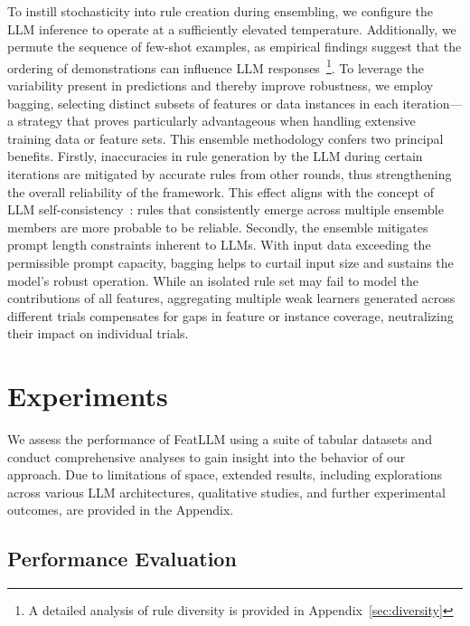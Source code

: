 To instill stochasticity into rule creation during ensembling, we configure the LLM inference to operate at a sufficiently elevated temperature. Additionally, we permute the sequence of few-shot examples, as empirical findings suggest that the ordering of demonstrations can influence LLM responses~\cite{lu2022fantastically}\footnote{A detailed analysis of rule diversity is provided in Appendix~\ref{sec:diversity}}. To leverage the variability present in predictions and thereby improve robustness, we employ bagging, selecting distinct subsets of features or data instances in each iteration—a strategy that proves particularly advantageous when handling extensive training data or feature sets. This ensemble methodology confers two principal benefits. Firstly, inaccuracies in rule generation by the LLM during certain iterations are mitigated by accurate rules from other rounds, thus strengthening the overall reliability of the framework. This effect aligns with the concept of LLM self-consistency~\cite{wang2022self}: rules that consistently emerge across multiple ensemble members are more probable to be reliable. Secondly, the ensemble mitigates prompt length constraints inherent to LLMs. With input data exceeding the permissible prompt capacity, bagging helps to curtail input size and sustains the model’s robust operation. While an isolated rule set may fail to model the contributions of all features, aggregating multiple weak learners generated across different trials compensates for gaps in feature or instance coverage, neutralizing their impact on individual trials.

\section{Experiments}
We assess the performance of \textsf{FeatLLM} using a suite of tabular datasets and conduct comprehensive analyses to gain insight into the behavior of our approach. Due to limitations of space, extended results, including explorations across various LLM architectures, qualitative studies, and further experimental outcomes, are provided in the Appendix.

\subsection{Performance Evaluation}
